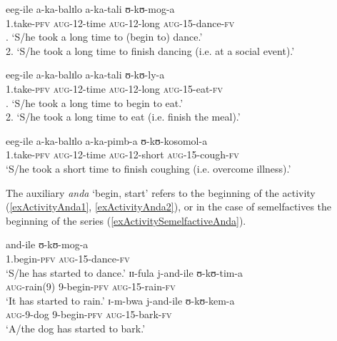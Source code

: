 \begin{exe}
\ex\label{exActivityTakeXTime}
\begin{xlist}
\ex \gll eeg-ile a-ka-balɪlo a-ka-tali ʊ-kʊ-mog-a\\
1.take-\textsc{pfv} \textsc{aug}-12-time \textsc{aug}-12-long \textsc{aug}-15-dance-\textsc{fv}\\
. \lq S/he took a long time to (begin to) dance.'\\
2. \lq S/he took a long time to finish dancing (i.e. at a social event).'

\ex \gll eeg-ile a-ka-balɪlo a-ka-tali ʊ-kʊ-ly-a\\
1.take-\textsc{pfv} \textsc{aug}-12-time \textsc{aug}-12-long \textsc{aug}-15-eat-\textsc{fv}\\
. \lq  S/he took a long time to begin to eat.'\\
2. \lq  S/he took a long time to eat (i.e. finish the meal).' 

\ex \gll eeg-ile a-ka-balɪlo a-ka-pimb-a ʊ-kʊ-kosomol-a\\
1.take-\textsc{pfv} \textsc{aug}-12-time \textsc{aug}-12-short \textsc{aug}-15-cough-\textsc{fv}\\
\glt \lq S/he took a short time to finish coughing (i.e. overcome illness).'
\end{xlist}
\end{exe}

The auxiliary \textit{anda} `begin, start' refers to the beginning of the activity (\ref{exActivityAnda1}, \ref{exActivityAnda2}), or in the case of semelfactives the beginning of the series (\ref{exActivitySemelfactiveAnda}).

\begin{exe}
\ex \begin{xlist}
\ex \label{exActivityAnda1}\gll and-ile ʊ-kʊ-mog-a\\
1.begin-\textsc{pfv} \textsc{aug}-15-dance-\textsc{fv}\\
\glt `S/he has started to dance.' 
\ex \label{exActivityAnda2} \gll ɪɪ-fula j-and-ile ʊ-kʊ-tim-a\\
\textsc{aug}-rain(9) 9-begin-\textsc{pfv} \textsc{aug}-15-rain-\textsc{fv}\\
\glt `It has started to rain.'
\ex \label{exActivitySemelfactiveAnda}\gll ɪ-m-bwa j-and-ile ʊ-kʊ-kem-a\\
\textsc{aug}-9-dog 9-begin-\textsc{pfv} \textsc{aug}-15-bark-\textsc{fv}\\
\glt `A/the dog has started to bark.'
\end{xlist}
\end{exe}


